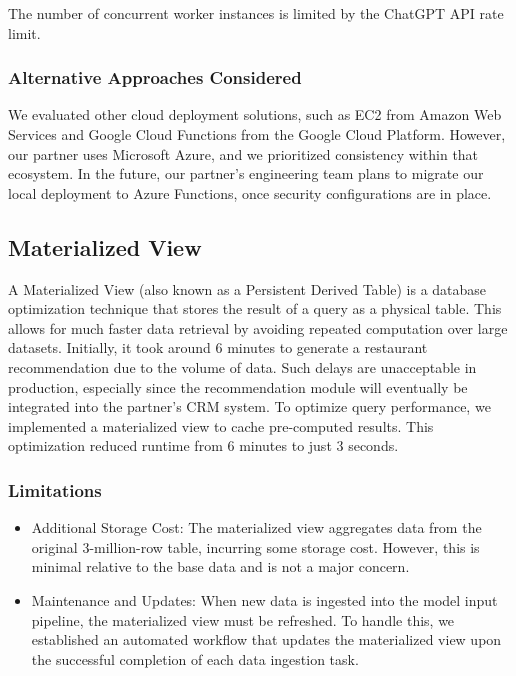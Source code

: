 \documentclass[
  11pt,
  a4paper,
  DIV=11,
  numbers=noendperiod]{scrartcl}
\providecommand{\tightlist}{%
  \setlength{\itemsep}{0pt}\setlength{\parskip}{0pt}}\usepackage{longtable,booktabs,array}
\begin{document}
The number of concurrent worker instances is limited by the ChatGPT API
rate limit.

\subsubsection{Alternative Approaches
Considered}\label{alternative-approaches-considered}

We evaluated other cloud deployment solutions, such as EC2 from Amazon
Web Services and Google Cloud Functions from the Google Cloud Platform.
However, our partner uses Microsoft Azure, and we prioritized
consistency within that ecosystem. In the future, our partner's
engineering team plans to migrate our local deployment to Azure
Functions, once security configurations are in place.

\subsection{Materialized View}\label{materialized-view}

A Materialized View (also known as a Persistent Derived Table) is a
database optimization technique that stores the result of a query as a
physical table. This allows for much faster data retrieval by avoiding
repeated computation over large datasets. Initially, it took around 6
minutes to generate a restaurant recommendation due to the volume of
data. Such delays are unacceptable in production, especially since the
recommendation module will eventually be integrated into the partner's
CRM system. To optimize query performance, we implemented a materialized
view to cache pre-computed results. This optimization reduced runtime
from 6 minutes to just 3 seconds.

\subsubsection{Limitations}\label{limitations}

\begin{itemize}
\tightlist
\item
  Additional Storage Cost: The materialized view aggregates data from
  the original 3-million-row table, incurring some storage cost.
  However, this is minimal relative to the base data and is not a major
  concern.
\item
  Maintenance and Updates: When new data is ingested into the model
  input pipeline, the materialized view must be refreshed. To handle
  this, we established an automated workflow that updates the
  materialized view upon the successful completion of each data
  ingestion task.
\end{itemize}
\end{document}
